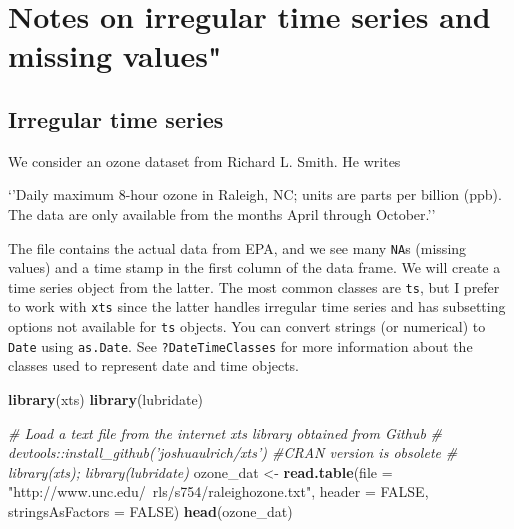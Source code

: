 \documentclass[]{book}
\newenvironment{Shaded}{\begin{snugshade}}{\end{snugshade}}
\newcommand{\CommentTok}[1]{\textcolor[rgb]{0.56,0.35,0.01}{\textit{#1}}}
\newcommand{\DataTypeTok}[1]{\textcolor[rgb]{0.13,0.29,0.53}{#1}}
\newcommand{\KeywordTok}[1]{\textcolor[rgb]{0.13,0.29,0.53}{\textbf{#1}}}
\newcommand{\NormalTok}[1]{#1}
\newcommand{\OtherTok}[1]{\textcolor[rgb]{0.56,0.35,0.01}{#1}}
\newcommand{\StringTok}[1]{\textcolor[rgb]{0.31,0.60,0.02}{#1}}
\begin{document}
\hypertarget{notes-on-irregular-time-series-and-missing-values}{%
\chapter{Notes on irregular time series and missing
values"}\label{notes-on-irregular-time-series-and-missing-values}}

\hypertarget{irregular-time-series}{%
\section{Irregular time series}\label{irregular-time-series}}

We consider an ozone dataset from Richard L. Smith. He writes

`'Daily maximum 8-hour ozone in Raleigh, NC; units are parts per billion
(ppb). The data are only available from the months April through
October.''

The file contains the actual data from EPA, and we see many \texttt{NA}s
(missing values) and a time stamp in the first column of the data frame.
We will create a time series object from the latter. The most common
classes are \texttt{ts}, but I prefer to work with \texttt{xts} since
the latter handles irregular time series and has subsetting options not
available for \texttt{ts} objects. You can convert strings (or
numerical) to \texttt{Date} using \texttt{as.Date}. See
\texttt{?DateTimeClasses} for more information about the classes used to
represent date and time objects.

\begin{Shaded}
\begin{Highlighting}[]
\KeywordTok{library}\NormalTok{(xts)}
\KeywordTok{library}\NormalTok{(lubridate)}
\end{Highlighting}
\end{Shaded}

\begin{Shaded}
\begin{Highlighting}[]
\CommentTok{# Load a text file from the internet xts library obtained from Github}
\CommentTok{# devtools::install_github('joshuaulrich/xts') #CRAN version is obsolete}
\CommentTok{# library(xts); library(lubridate)}
\NormalTok{ozone_dat <-}\StringTok{ }\KeywordTok{read.table}\NormalTok{(}\DataTypeTok{file =} \StringTok{"http://www.unc.edu/~rls/s754/raleighozone.txt"}\NormalTok{, }
    \DataTypeTok{header =} \OtherTok{FALSE}\NormalTok{, }\DataTypeTok{stringsAsFactors =} \OtherTok{FALSE}\NormalTok{)}
\KeywordTok{head}\NormalTok{(ozone_dat)}
\end{Highlighting}
\end{Shaded}
\end{document}
